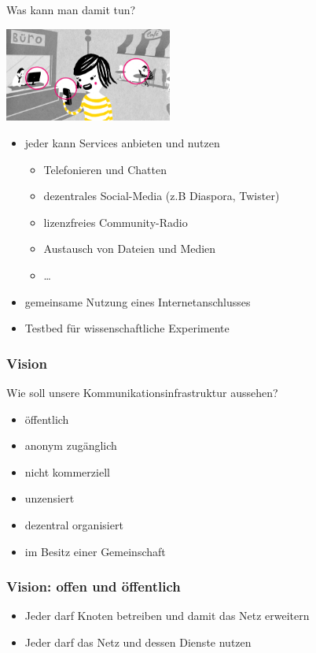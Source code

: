 \documentclass[handout]{beamer}
\begin{document}
\begin{frame}{Was kann man damit tun?}
	\vfill
	\begin{center}
		\includegraphics[width=5.5cm]{images/verbindet}
	\end{center}
	
	\begin{itemize}[<+->]
		\item jeder kann Services anbieten und nutzen
		\begin{itemize}
			\item Telefonieren und Chatten
			\item dezentrales Social-Media (z.B Diaspora, Twister)
			\item lizenzfreies Community-Radio
			\item Austausch von Dateien und Medien
			\item \ldots
		\end{itemize}
		\item gemeinsame Nutzung eines Internetanschlusses
		\item Testbed f\"ur wissenschaftliche Experimente
	\end{itemize}
	\vfill
\end{frame}

\begin{frame}
	\frametitle{Vision}
	
	Wie soll unsere Kommunikationsinfrastruktur aussehen?
	
	\begin{itemize}[<+->]
		\item öffentlich
		\item anonym zugänglich
		\item nicht kommerziell
		\item unzensiert
		\item dezentral organisiert
		\item im Besitz einer Gemeinschaft
	\end{itemize}
\end{frame}

\begin{frame}
	\frametitle{Vision: offen und öffentlich}
	
	\begin{itemize}[<+->]
		\item Jeder darf Knoten betreiben und damit das Netz erweitern
		\item Jeder darf das Netz und dessen Dienste nutzen
	\end{itemize}
\end{frame}
\end{document}
